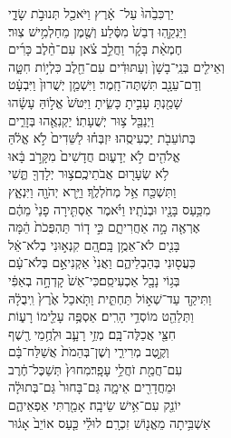 \documentclass[11pt, openany]{book}
\begin{document}
יַרְכִּבֵ֙הוּ֙ עַל־  אָ֔רֶץ \hfill וַיֹּאכַ֖ל תְּנוּבֹ֣ת שָׂדָ֑י\\
וַיֵּנִקֵ֤הֽוּ דְבַשׁ֙ מִסֶּ֔לַע \hfill וְשֶׁ֖מֶן מֵחַלְמִ֥ישׁ צֽוּר׃\\
חֶמְאַ֨ת בָּקָ֜ר וַחֲלֵ֣ב צֹ֗אן \hfill עִם־חֵ֨לֶב כָּרִ֜ים\\
וְאֵילִ֤ים בְּנֵֽי־בָשָׁן֙ וְעַתּוּדִ֔ים \hfill עִם־חֵ֖לֶב כִּלְי֣וֹת חִטָּ֑ה\\
וְדַם־עֵנָ֖ב תִּשְׁתֶּה־חָֽמֶר׃ \hfill וַיִּשְׁמַ֤ן יְשֻׁרוּן֙ וַיִּבְעָ֔ט\\
שָׁמַ֖נְתָּ עָבִ֣יתָ כָּשִׂ֑יתָ \hfill וַיִּטֹּשׁ֙ אֱל֣וֹהַּ עָשָׂ֔הוּ\\
וַיְנַבֵּ֖ל צ֥וּר יְשֻׁעָתֽוֹ׃ \hfill יַקְנִאֻ֖הוּ בְּזָרִ֑ים\\
בְּתוֹעֵבֹ֖ת יַכְעִיסֻֽהוּ׃ \hfill יִזְבְּח֗וּ לַשֵּׁדִים֙ לֹ֣א אֱלֹ֔הַּ\\
אֱלֹהִ֖ים לֹ֣א יְדָע֑וּם \hfill חֲדָשִׁים֙ מִקָּרֹ֣ב בָּ֔אוּ\\
לֹ֥א שְׂעָר֖וּם אֲבֹתֵיכֶֽם׃\hfill צ֥וּר יְלָדְךָ֖ תֶּ֑שִׁי\\
וַתִּשְׁכַּ֖ח אֵ֥ל מְחֹלְלֶֽךָ׃ \hfill וַיַּ֥רְא יְהֹוָ֖ה וַיִּנְאָ֑ץ\\
מִכַּ֥עַס בָּנָ֖יו וּבְנֹתָֽיו׃ \hfill וַיֹּ֗אמֶר אַסְתִּ֤ירָה פָנַי֙ מֵהֶ֔ם\\
אֶרְאֶ֖ה מָ֣ה אַחֲרִיתָ֑ם \hfill כִּ֣י ד֤וֹר תַּהְפֻּכֹת֙ הֵ֔מָּה\\
בָּנִ֖ים לֹא־אֵמֻ֥ן בָּֽם׃\hfill הֵ֚ם קִנְא֣וּנִי בְלֹא־אֵ֔ל\\
כִּעֲס֖וּנִי בְּהַבְלֵיהֶ֑ם \hfill וַאֲנִי֙ אַקְנִיאֵ֣ם בְּלֹא־עָ֔ם\\
בְּג֥וֹי נָבָ֖ל אַכְעִיסֵֽם׃\hfill כִּי־אֵשׁ֙ קָדְחָ֣ה בְאַפִּ֔י\\
וַתִּיקַ֖ד עַד־שְׁא֣וֹל תַּחְתִּ֑ית \hfill וַתֹּ֤אכַל אֶ֙רֶץ֙ וִֽיבֻלָ֔הּ\\
וַתְּלַהֵ֖ט מוֹסְדֵ֥י הָרִֽים׃ \hfill אַסְפֶּ֥ה עָלֵ֖ימוֹ רָע֑וֹת\\
חִצַּ֖י אֲכַלֶּה־בָּֽם׃ \hfill מְזֵ֥י רָעָ֛ב וּלְחֻ֥מֵי רֶ֖שֶׁף\\
וְקֶ֣טֶב מְרִירִ֑י \hfill וְשֶׁן־בְּהֵמֹת֙ אֲשַׁלַּח־בָּ֔ם\\
עִם־חֲמַ֖ת זֹחֲלֵ֥י עָפָֽר׃\hfill מִחוּץ֙ תְּשַׁכֶּל־חֶ֔רֶב\\
וּמֵחֲדָרִ֖ים אֵימָ֑ה \hfill גַּם־בָּחוּר֙ גַּם־בְּתוּלָ֔ה\\
יוֹנֵ֖ק עִם־אִ֥ישׁ שֵׂיבָֽה׃ \hfill אָמַ֖רְתִּי אַפְאֵיהֶ֑ם\\
אַשְׁבִּ֥יתָה מֵאֱנ֖וֹשׁ זִכְרָֽם׃ \hfill לוּלֵ֗י כַּ֤עַס אוֹיֵב֙ אָג֔וּר\\
\end{document}

